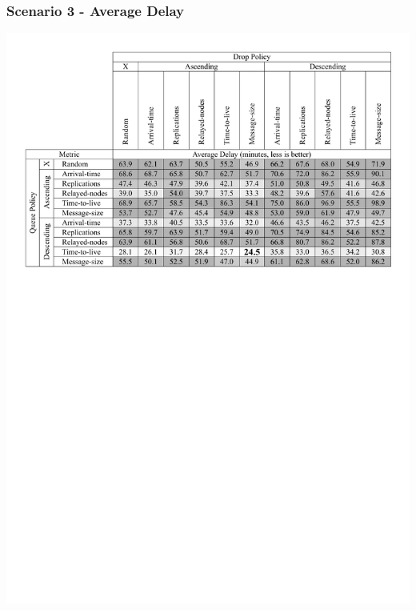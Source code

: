 \begin{frame}
  \frametitle{Scenario 3 - Average Delay}
  \begin{center}
   \includegraphics[width=1.0\textwidth]{fig/tables/scenario3_part3.pdf}
  \end{center}
\end{frame}

